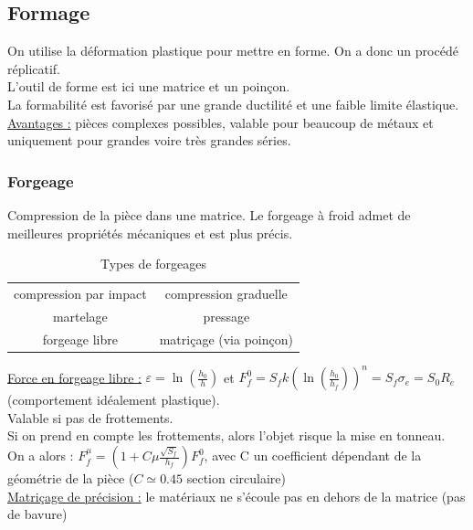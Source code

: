 \documentclass[../main.tex]{subfiles}
\begin{document}
\subsection{Formage}
On utilise la déformation plastique pour mettre en forme. On a donc un procédé réplicatif.\\
L'outil de forme est ici une matrice et un poinçon.\\

La formabilité est favorisé par une grande ductilité et une faible limite élastique.\\

\underline{Avantages :} pièces complexes possibles, valable pour beaucoup de métaux et uniquement pour grandes voire très grandes séries.\\

\subsubsection{Forgeage}
Compression de la pièce dans une matrice. Le forgeage à froid admet de meilleures propriétés mécaniques et est plus précis. \\
\begin{table}[hbt!]
    \centering
    \begin{tabular}{c|c}
    \hline
        compression par impact & compression graduelle \\
        martelage & pressage\\
        forgeage libre & matriçage (via poinçon)\\
        \hline
    \end{tabular}
    \caption{Types de forgeages}
\end{table}

\quad \underline{Force en forgeage libre :} $\varepsilon = \ln(\frac{h_0}{h})$ et $F_f^0 = S_f k (\ln(\frac{h_0}{h_f}))^n = S_f \sigma_e = S_0 R_e$ (comportement idéalement plastique).\\
Valable si pas de frottements.\\

Si on prend en compte les frottements, alors l'objet risque la mise en tonneau.\\
On a alors : $F_f^\mu = (1+C\mu \frac{\sqrt{S_f}}{h_f}) F_f^0$, avec C un coefficient dépendant de la géométrie de la pièce ($C\simeq 0.45$ section circulaire)\\

\quad \underline{Matriçage de précision :} le matériaux ne s'écoule pas en dehors de la matrice (pas de bavure)\\
\end{document}
